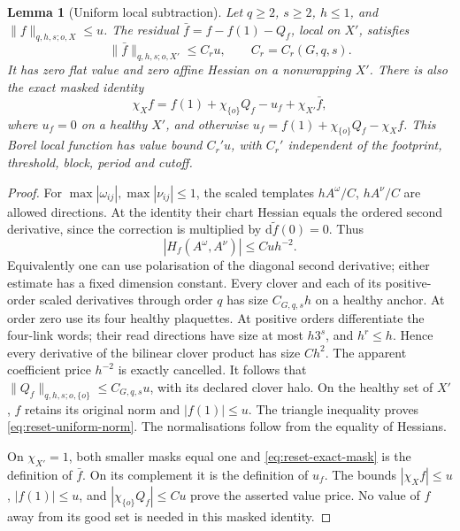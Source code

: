 \documentclass[11pt,reqno]{amsart}
\numberwithin{equation}{section}
\newtheorem{lemma}[theorem]{Lemma}
\theoremstyle{definition}
\theoremstyle{remark}
\newcommand{\dd}{\mathrm d}
\begin{document}
\begin{lemma}[Uniform local subtraction]
\label{lem:reset-local-norm}
Let \(q\ge2\), \(s\ge2\), \(h\le1\), and
\(\|f\|_{q,h,s;o,X}\le u\). The residual
\(\bar f=f-f(1)-Q_f\), local on \(X'\), satisfies
\begin{equation}
 \|\bar f\|_{q,h,s;o,X'}\le C_r u,
                         \qquad C_r=C_r(G,q,s).
 \label{eq:reset-uniform-norm}
\end{equation}
It has zero flat value and zero affine Hessian on a
nonwrapping \(X'\). There is also the exact masked identity
\begin{equation}
 \chi_X f=f(1)+\chi_{\{o\}}Q_f-u_f+\chi_{X'}\bar f,
 \label{eq:reset-exact-mask}
\end{equation}
where \(u_f=0\) on a healthy \(X'\), and otherwise
\(u_f=f(1)+\chi_{\{o\}}Q_f-\chi_Xf\).
This Borel local function has value bound \(C_r'u\), with
\(C_r'\) independent of the footprint, threshold, block,
period and cutoff.
\end{lemma}
\begin{proof}
For \(\max|\omega_{ij}|,\max|\nu_{ij}|\le1\), the scaled
templates \(hA^\omega/C\), \(hA^\nu/C\) are allowed
directions. At the identity their chart Hessian equals
the ordered second derivative, since the correction is
multiplied by \(\dd\widetilde f(0)=0\). Thus
\[
                    |H_f(A^\omega,A^\nu)|\le C u h^{-2}.
\]
Equivalently one can use polarisation of the diagonal
second derivative; either estimate has a fixed dimension
constant. Every clover and each of its positive-order
scaled derivatives through order \(q\) has size
\(C_{G,q,s}h\) on a healthy anchor. At order zero use its
four healthy plaquettes. At positive orders differentiate
the four-link words; their read directions have size at
most \(h3^s\), and \(h^r\le h\). Hence every derivative
of the bilinear clover product has size \(Ch^2\).
The apparent coefficient price \(h^{-2}\) is exactly
cancelled. It follows that
\(\|Q_f\|_{q,h,s;o,\{o\}}\le C_{G,q,s}u\), with its
declared clover halo. On the healthy set of \(X'\),
\(f\) retains its original norm and \(|f(1)|\le u\).
The triangle inequality proves \eqref{eq:reset-uniform-norm}.
The normalisations follow from the equality of Hessians.

On \(\chi_{X'}=1\), both smaller masks equal one and
\eqref{eq:reset-exact-mask} is the definition of \(\bar f\).
On its complement it is the definition of \(u_f\).
The bounds \(|\chi_Xf|\le u\), \(|f(1)|\le u\), and
\(|\chi_{\{o\}}Q_f|\le Cu\) prove the asserted value
price. No value of \(f\) away from its good set is needed
in this masked identity.
\end{proof}
\end{document}

